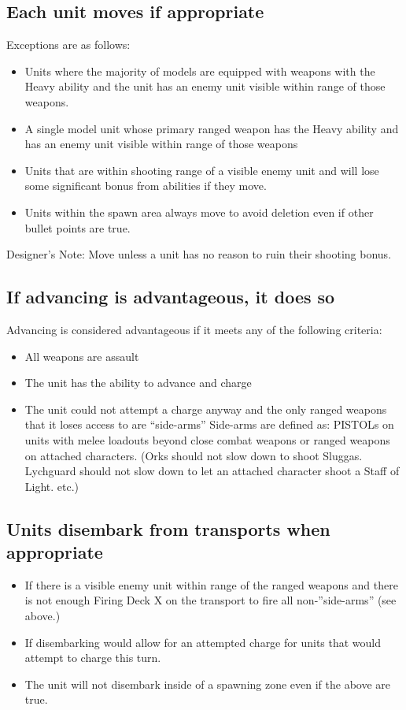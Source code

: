 \documentclass{HordeModeTarot}
\begin{document}
\subsection{Each unit moves if appropriate}
Exceptions are as follows:
\begin{itemize}
\item Units where the majority of models are equipped with weapons with the Heavy ability and the unit has an enemy unit visible within range of those weapons.
\item A single model unit whose primary ranged weapon has the Heavy ability and has an enemy unit visible within range of those weapons
\item Units that are within shooting range of a visible enemy unit and will lose some significant bonus from abilities if they move.
\item Units within the spawn area always move to avoid deletion even if other bullet points are true.
\end{itemize}
Designer’s Note: Move unless a unit has no reason to ruin their shooting bonus.

\subsection{If advancing is advantageous, it does so} 
Advancing is considered advantageous if it meets any of the following criteria:
\begin{itemize}
\item All weapons are assault 
\item The unit has the ability to advance and charge
\item The unit could not attempt a charge anyway and the only ranged weapons that it loses access to are “side-arms”
Side-arms are defined as: PISTOLs on units with melee loadouts beyond close combat weapons or ranged weapons on attached characters. (Orks should not slow down to shoot Sluggas.  Lychguard should not slow down to let an attached character shoot a Staff of Light. etc.)
\end{itemize}

\subsection{Units disembark from transports when appropriate}
\begin{itemize}
\item If there is a visible enemy unit within range of the ranged weapons and there is not enough Firing Deck X on the transport to fire all non-”side-arms” (see above.)
\item If disembarking would allow for an attempted charge for units that would attempt to charge this turn.
\item The unit will not disembark inside of a spawning zone even if the above are true.
\end{itemize}
\end{document}
